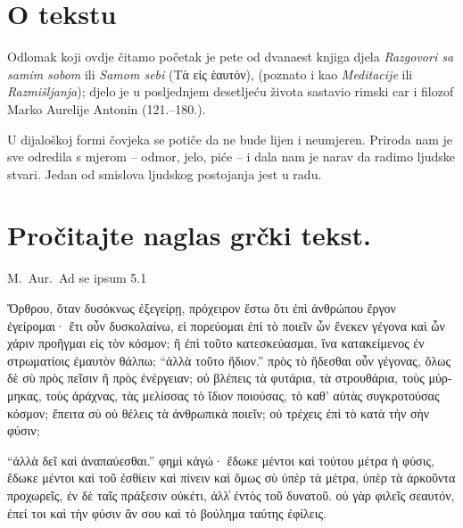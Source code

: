 
\section*{O tekstu}

Odlomak koji ovdje čitamo početak je pete od dvanaest knjiga djela \textit{Razgovori sa samim sobom} ili \textit{Samom sebi} \textgreek[variant=ancient]{(Τὰ εἰς ἑαυτόν),} (poznato i kao \textit{Meditacije} ili \textit{Razmišljanja}); djelo je u posljednjem desetljeću života sastavio rimski car i filozof Marko Aurelije Antonin (121.–180.).

U dijaloškoj formi čovjeka se potiče da ne bude lijen i neumjeren. Priroda nam je sve odredila s mjerom – odmor, jelo, piće – i dala nam je narav da radimo ljudske stvari. Jedan od smislova ljudskog postojanja jest u radu.




\section*{Pročitajte naglas grčki tekst.}

M.\ Aur.\ Ad se ipsum 5.1


\medskip


{\large

\begin{greek}

\noindent  Ὄρθρου, ὅταν δυσόκνως ἐξεγείρῃ, πρόχειρον ἔστω ὅτι ἐπὶ ἀνθρώπου ἔργον ἐγείρομαι· ἔτι οὖν δυσκολαίνω, εἰ πορεύομαι ἐπὶ τὸ ποιεῖν ὧν ἕνεκεν γέγονα καὶ ὧν χάριν προῆγμαι εἰς τὸν κόσμον; ἢ ἐπὶ τοῦτο κατεσκεύασμαι, ἵνα κατακείμενος ἐν στρωματίοις ἐμαυτὸν θάλπω; ``ἀλλὰ τοῦτο ἥδιον.'' πρὸς τὸ ἥδεσθαι οὖν γέγονας, ὅλως δὲ σὺ πρὸς πεῖσιν ἢ πρὸς ἐνέργειαν; οὐ βλέπεις τὰ φυτάρια, τὰ στρουθάρια, τοὺς μύρμηκας, τοὺς ἀράχνας, τὰς μελίσσας τὸ ἴδιον ποιούσας, τὸ καθ' αὑτὰς συγκροτούσας κόσμον; ἔπειτα σὺ οὐ θέλεις τὰ ἀνθρωπικὰ ποιεῖν; οὐ τρέχεις ἐπὶ τὸ κατὰ τὴν σὴν φύσιν; 

\noindent ``ἀλλὰ δεῖ καὶ ἀναπαύεσθαι.'' φημὶ κἀγώ· ἔδωκε μέντοι καὶ τούτου μέτρα ἡ φύσις, ἔδωκε μέντοι καὶ τοῦ ἐσθίειν καὶ πίνειν καὶ ὅμως σὺ ὑπὲρ τὰ μέτρα, ὑπὲρ τὰ ἀρκοῦντα προχωρεῖς, ἐν δὲ ταῖς πράξεσιν οὐκέτι, ἀλλ̓ ἐντὸς τοῦ δυνατοῦ. οὐ γὰρ φιλεῖς σεαυτόν, ἐπεί τοι καὶ τὴν φύσιν ἄν σου καὶ τὸ βούλημα ταύτης ἐφίλεις.

\end{greek}

}


